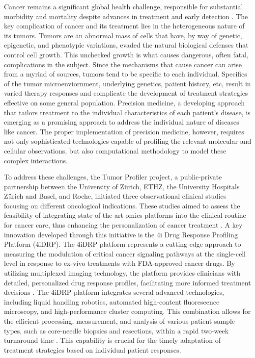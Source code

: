 Cancer remains a significant global health challenge, responsible for substantial morbidity and mortality despite advances in treatment and early detection \cite{}.
The key complication of cancer and its treatment lies in the heterogeneous nature of its tumors.
Tumors are an abnormal mass of cells that have, by way of genetic, epigenetic, and phenotypic variations, evaded the natural biological defenses that control cell growth.
This unchecked growth is what causes dangerous, often fatal, complications in the subject.
Since the mechanisms that cause cancer can arise from a myriad of sources, tumors tend to be specific to each individual.
Specifics of the tumor microenviornment, underlying genetics, patient history, etc,
result in varied therapy responses and complicate the development of treatment strategies effective on some general population.
Precision medicine, a developing approach that tailors treatment to the individual characteristics of each patient's disease,
is emerging as a promising approach to address the individual nature of diseases like cancer.
The proper implementation of precision medicine, however, requires not only sophisticated technologies capable of profiling the relevant molecular and cellular observations,
but also computational methodology to model these complex interactions.

To address these challenges, the Tumor Profiler project, a public-private partnership between the University of Zürich, ETHZ, the University Hospitals Zürich and Basel, and Roche, initiated three observational clinical studies focusing on different oncological indications.
These studies aimed to assess the feasibility of integrating state-of-the-art omics platforms into the clinical routine for cancer care, thus enhancing the personalization of cancer treatment \cite{}.
A key innovation developed through this initiative is the 4i Drug Response Profiling Platform (4iDRP).
The 4iDRP platform represents a cutting-edge approach to measuring the modulation of critical cancer signaling pathways at the single-cell level in response to ex-vivo treatments with FDA-approved cancer drugs.
By utilizing multiplexed imaging technology, the platform provides clinicians with detailed, personalized drug response profiles, facilitating more informed treatment decisions \cite{}.
The 4iDRP platform integrates several advanced technologies, including liquid handling robotics, automated high-content fluorescence microscopy, and high-performance cluster computing.
This combination allows for the efficient processing, measurement, and analysis of various patient sample types, such as core-needle biopsies and resections, within a rapid two-week turnaround time \cite{}.
This capability is crucial for the timely adaptation of treatment strategies based on individual patient responses.

